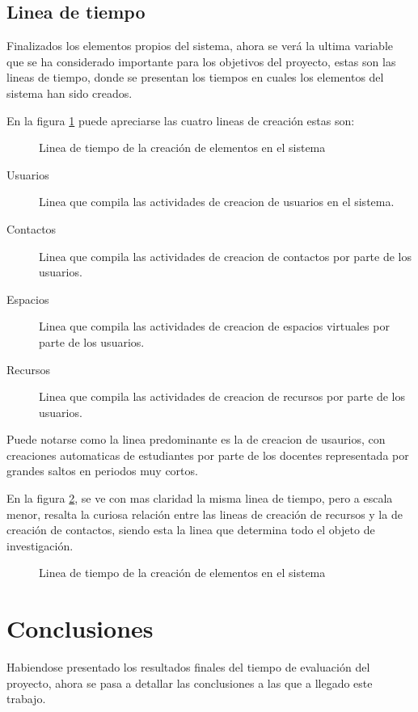 \subsection{Linea de tiempo}
Finalizados los elementos propios del sistema, ahora se verá la ultima variable
que se ha considerado importante para los objetivos del proyecto, estas son las
lineas de tiempo, donde se presentan los tiempos en cuales los elementos del
sistema han sido creados.

En la figura \ref{tiempos_area_1} puede apreciarse las cuatro lineas de creación
estas son:

\begin{figure}
\centering

\caption{Linea de tiempo de la creación de elementos en el sistema}
\label{tiempos_area_1}
\end{figure}

\begin{description}
\item [Usuarios] Linea que compila las actividades de creacion de usuarios en el
sistema.
\item [Contactos] Linea que compila las actividades de creacion de contactos por
parte de los usuarios.
\item [Espacios] Linea que compila las actividades de creacion de espacios
virtuales por parte de los usuarios.
\item [Recursos] Linea que compila las actividades de creacion de recursos por
parte de los usuarios.
\end{description}

Puede notarse como la linea predominante es la de creacion de usaurios, con
creaciones automaticas de estudiantes por parte de los docentes representada por
grandes saltos en periodos muy cortos.

En la figura \ref{tiempos_area_2}, se ve con mas claridad la misma linea de
tiempo, pero a escala menor, resalta la curiosa relación entre las lineas
de creación de recursos y la de creación de contactos, siendo esta la linea que
determina todo el objeto de investigación.

\begin{figure}
\centering

\caption{Linea de tiempo de la creación de elementos en el sistema}
\label{tiempos_area_2}
\end{figure}

\section{Conclusiones}
Habiendose presentado los resultados finales del tiempo de evaluación del
proyecto, ahora se pasa a detallar las conclusiones a las que a llegado este
trabajo.

